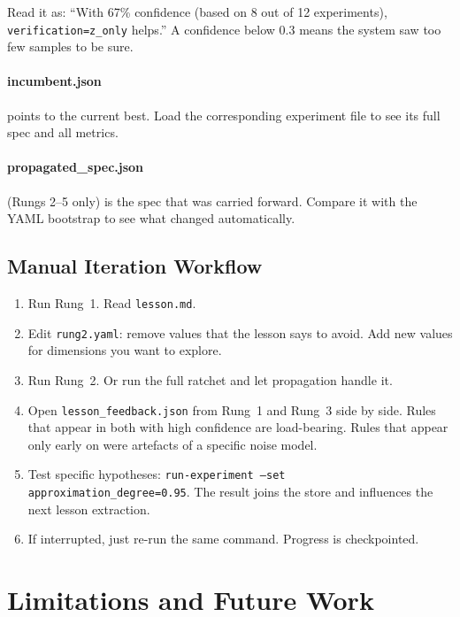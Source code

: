 \documentclass[11pt,a4paper]{article}
\newcommand{\code}[1]{\texttt{#1}}
\newcommand{\file}[1]{\texttt{\small #1}}
\begin{document}
Read it as: ``With 67\% confidence (based on 8 out of 12 experiments),
\code{verification=z\_only} helps.'' A confidence below 0.3 means the system
saw too few samples to be sure.

\paragraph{incumbent.json} points to the current best. Load the corresponding
experiment file to see its full spec and all metrics.

\paragraph{propagated\_spec.json} (Rungs 2--5 only) is the spec that was
carried forward. Compare it with the YAML bootstrap to see what changed
automatically.

\subsection{Manual Iteration Workflow}

\begin{enumerate}
  \item Run Rung~1. Read \file{lesson.md}.
  \item Edit \file{rung2.yaml}: remove values that the lesson says to avoid.
    Add new values for dimensions you want to explore.
  \item Run Rung~2. Or run the full ratchet and let propagation handle it.
  \item Open \file{lesson\_feedback.json} from Rung~1 and Rung~3 side by side.
    Rules that appear in both with high confidence are load-bearing. Rules
    that appear only early on were artefacts of a specific noise model.
  \item Test specific hypotheses: \code{run-experiment --set
    approximation\_degree=0.95}. The result joins the store and influences
    the next lesson extraction.
  \item If interrupted, just re-run the same command. Progress is checkpointed.
\end{enumerate}

\section{Limitations and Future Work}
\label{sec:limitations}
\end{document}
